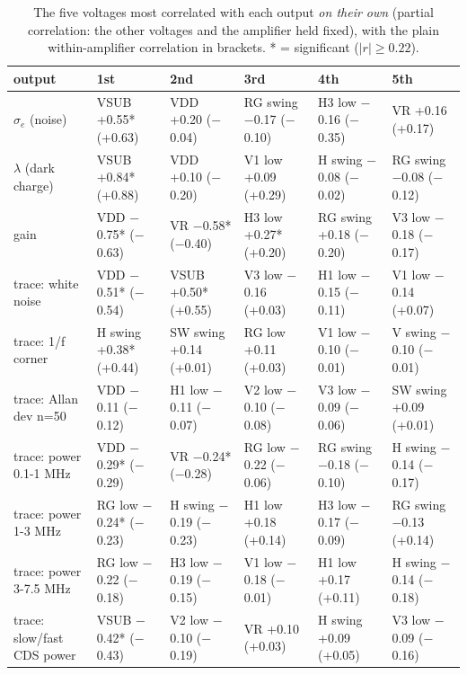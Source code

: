 \begin{table}[H]\centering\scriptsize
\caption{The five voltages most correlated with each output \emph{on their own} (partial correlation: the other voltages and the amplifier held fixed), with the plain within-amplifier correlation in brackets. * = significant ($|r|\ge0.22$).}\label{tab:corr}
\begin{tabular}{p{3cm}p{2.2cm}p{2.2cm}p{2.2cm}p{2.2cm}p{2.2cm}}\toprule
output & 1st & 2nd & 3rd & 4th & 5th\\\midrule
$\sigma_e$ (noise) & VSUB +0.55* (+0.63) & VDD +0.20 ($-$0.04) & RG swing $-$0.17 ($-$0.10) & H3 low $-$0.16 ($-$0.35) & VR +0.16 (+0.17)\\
$\lambda$ (dark charge) & VSUB +0.84* (+0.88) & VDD +0.10 ($-$0.20) & V1 low +0.09 (+0.29) & H swing $-$0.08 ($-$0.02) & RG swing $-$0.08 ($-$0.12)\\
gain & VDD $-$0.75* ($-$0.63) & VR $-$0.58* ($-$0.40) & H3 low +0.27* (+0.20) & RG swing +0.18 ($-$0.20) & V3 low $-$0.18 ($-$0.17)\\
trace: white noise & VDD $-$0.51* ($-$0.54) & VSUB +0.50* (+0.55) & V3 low $-$0.16 (+0.03) & H1 low $-$0.15 ($-$0.11) & V1 low $-$0.14 (+0.07)\\
trace: 1/f corner & H swing +0.38* (+0.44) & SW swing +0.14 (+0.01) & RG low +0.11 (+0.03) & V1 low $-$0.10 ($-$0.01) & V swing $-$0.10 ($-$0.01)\\
trace: Allan dev n=50 & VDD $-$0.11 ($-$0.12) & H1 low $-$0.11 ($-$0.07) & V2 low $-$0.10 ($-$0.08) & V3 low $-$0.09 ($-$0.06) & SW swing +0.09 (+0.01)\\
trace: power 0.1-1 MHz & VDD $-$0.29* ($-$0.29) & VR $-$0.24* ($-$0.28) & RG low $-$0.22 ($-$0.06) & RG swing $-$0.18 ($-$0.10) & H swing $-$0.14 ($-$0.17)\\
trace: power 1-3 MHz & RG low $-$0.24* ($-$0.23) & H swing $-$0.19 ($-$0.23) & H1 low +0.18 (+0.14) & H3 low $-$0.17 ($-$0.09) & RG swing $-$0.13 (+0.14)\\
trace: power 3-7.5 MHz & RG low $-$0.22 ($-$0.18) & H3 low $-$0.19 ($-$0.15) & V1 low $-$0.18 ($-$0.01) & H1 low +0.17 (+0.11) & H swing $-$0.14 ($-$0.18)\\
trace: slow/fast CDS power & VSUB $-$0.42* ($-$0.43) & V2 low $-$0.10 ($-$0.19) & VR +0.10 (+0.03) & H swing +0.09 (+0.05) & V3 low $-$0.09 ($-$0.16)\\
\bottomrule\end{tabular}\end{table}

